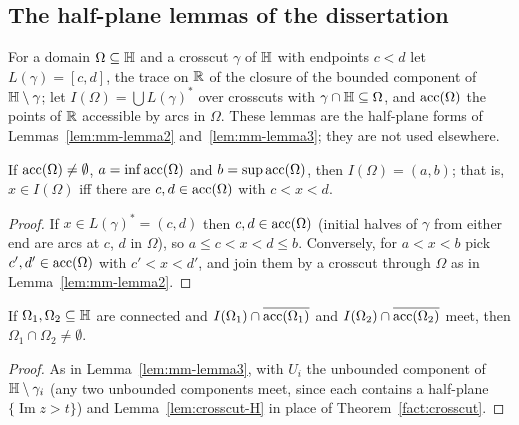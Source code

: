 \subsection*{The half-plane lemmas of the dissertation}
For a domain $\Omega\subseteq\mathbb{H}$ and a crosscut $\gamma$ of $\mathbb{H}$ with endpoints $c<d$ let
$L(\gamma)=[c,d]$, the trace on $\mathbb{R}$ of the closure of the bounded component of $\mathbb{H}\setminus\gamma$; let
$I(\Omega)=\bigcup L(\gamma)^*$ over crosscuts with $\gamma\cap\mathbb{H}\subseteq\Omega$, and $\operatorname{acc}(\Omega)$ the
points of $\mathbb{R}$ accessible by arcs in $\Omega$. These lemmas are the half-plane forms of
Lemmas~\ref{lem:mm-lemma2} and~\ref{lem:mm-lemma3}; they are not used elsewhere.

\begin{lemma}\label{lem:th-lemma7}
If $\operatorname{acc}(\Omega)\ne\emptyset$, $a=\inf\operatorname{acc}(\Omega)$ and $b=\sup\operatorname{acc}(\Omega)$, then $I(\Omega)=(a,b)$; that is,
$x\in I(\Omega)$ iff there are $c,d\in\operatorname{acc}(\Omega)$ with $c<x<d$.
\end{lemma}
\begin{proof}
If $x\in L(\gamma)^*=(c,d)$ then $c,d\in\operatorname{acc}(\Omega)$ (initial halves of $\gamma$ from either end are arcs at $c$,
$d$ in $\Omega$), so $a\le c<x<d\le b$. Conversely, for $a<x<b$ pick $c',d'\in\operatorname{acc}(\Omega)$ with $c'<x<d'$, and join
them by a crosscut through $\Omega$ as in Lemma~\ref{lem:mm-lemma2}.
\end{proof}

\begin{lemma}\label{lem:th-lemma8}
If $\Omega_1,\Omega_2\subseteq\mathbb{H}$ are connected and $I(\Omega_1)\cap\overline{\operatorname{acc}(\Omega_1)}$ and
$I(\Omega_2)\cap\overline{\operatorname{acc}(\Omega_2)}$ meet, then $\Omega_1\cap\Omega_2\ne\emptyset$.
\end{lemma}
\begin{proof}
As in Lemma~\ref{lem:mm-lemma3}, with $U_i$ the unbounded component of $\mathbb{H}\setminus\gamma_i$ (any two
unbounded components meet, since each contains a half-plane $\{\operatorname{Im}z>t\}$) and
Lemma~\ref{lem:crosscut-H} in place of Theorem~\ref{fact:crosscut}.
\end{proof}
